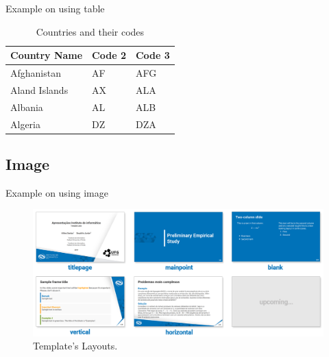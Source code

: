 \documentclass[aspectratio=169,t,xcolor=table]{beamer}
\begin{document}
\begin{frame}{Example on using table}

    \begin{table}[]
        \centering
        \caption{\label{tab:1}Countries and their codes}
        
        \renewcommand{\arraystretch}{1.5}
        \setlength{\tabcolsep}{10pt}
        
        {
            \begin{tabular}{ p{3cm}p{3cm}p{3cm}  }
                \toprule 
                \textbf{Country Name} & \textbf{Code 2} & \textbf{Code 3} \\
                \midrule
                Afghanistan & AF &AFG \\
                Aland Islands & AX   & ALA \\
                Albania &AL & ALB \\
                Algeria    &DZ & DZA \\
                \bottomrule
            \end{tabular}
        }
    \end{table}
    
\end{frame}

\subsection{Image}

\begin{frame}{Example on using image}

    \begin{figure}
        \centering
        \includegraphics[width=.9\textwidth]{readme/layouts.png}
        \caption{Template's Layouts.}
        \label{fig:layouts}
    \end{figure}
    
\end{frame}
\end{document}
